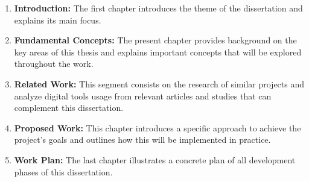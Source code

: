 \begin{enumerate}
  \item \textbf{Introduction:} The first chapter introduces the theme of the dissertation and explains its main focus.
  
  \item \textbf{Fundamental Concepts:} The present chapter provides background on the key areas of this thesis and explains important concepts that will be explored throughout the work.
  
  \item \textbf{Related Work:} This segment consists on the research of similar projects and analyze digital tools usage from relevant articles and studies that can complement this dissertation.

  \item \textbf{Proposed Work:} This chapter introduces a specific approach to achieve the project's goals and outlines how this will be implemented in practice.
  
  \item \textbf{Work Plan:} The last chapter illustrates a concrete plan of all development phases of this dissertation.
\end{enumerate}
